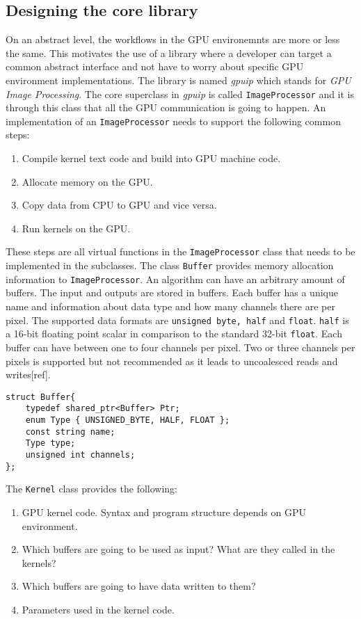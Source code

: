 \subsection {Designing the core library}

On an abstract level, the workflows in the GPU environemnts are more or less the same. This motivates the use of a library where a developer can target a common abstract interface and not have to worry about specific GPU environment implementations. The library is named \emph{gpuip} which stands for \emph {GPU Image Processing}. The core superclass in \emph{gpuip} is called {\tt ImageProcessor} and it is through this class that all the GPU communication is going to happen. An implementation of an {\tt ImageProcessor} needs to support the following common steps:

\begin{enumerate}
\item Compile kernel text code and build into GPU machine code.
\item Allocate memory on the GPU.
\item Copy data from CPU to GPU and vice versa.
\item Run kernels on the GPU.
\end{enumerate}

These steps are all virtual functions in the {\tt ImageProcessor} class that needs to be implemented in the subclasses. The class {\tt Buffer} provides memory allocation information to {\tt ImageProcessor}. An algorithm can have an arbitrary amount of buffers. The input and outputs are stored in buffers. Each buffer has a unique name and information about data type and how many channels there are per pixel. The supported data formats are {\tt unsigned byte, half} and {\tt float}. {\tt half} is a 16-bit floating point scalar in comparison to the standard 32-bit {\tt float}. Each buffer can have between one to four channels per pixel. Two or three channels per pixels is supported but not recommended as it leads to uncoalesced reads and writes[ref]. 
\newline
\renewcommand{\lstlistingname}{Code}
\begin{lstlisting}[caption= Buffer struct, label=bufferapi]
struct Buffer{
    typedef shared_ptr<Buffer> Ptr;
    enum Type { UNSIGNED_BYTE, HALF, FLOAT };
    const string name;
    Type type;
    unsigned int channels;
};
\end{lstlisting}
\newpage
The {\tt Kernel} class provides the following:
\begin{enumerate}
\item GPU kernel code. Syntax and program structure depends on GPU environment.
\item Which buffers are going to be used as input? What are they called in the kernels?
\item Which buffers are going to have data written to them?
\item Parameters used in the kernel code.
\end{enumerate}

